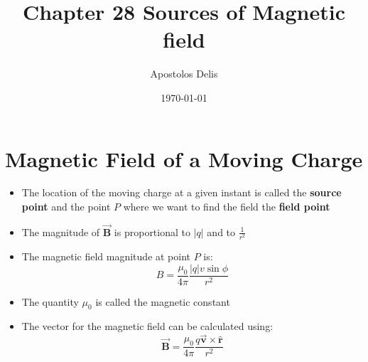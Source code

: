 \documentclass[11pt, a4paper]{article}
\begin{document}
\title{Chapter 28 Sources of Magnetic field}
\author{Apostolos Delis}

\date{\today}
\maketitle

\tableofcontents
\section[28.1, Magnetic Field of a Moving Charge]{Magnetic Field of a Moving Charge}
\begin{itemize}
    \item The location of the moving charge at a given instant is called the
        \textbf{source point} and the point $P$ where we want to find the field the
        \textbf{field point}
    \item The magnitude of $\vec{\mathbf{B}}$ is proportional to $|q|$ and to
        $\frac{1}{r^2}$
    \item The magnetic field magnitude at point $P$ is:
        \begin{equation}
            B = \frac{\mu_0}{4\pi} \frac{|q|v\sin\phi}{r^2}
        \end{equation}
    \item The quantity $\mu_0$ is called the magnetic constant
    \item The vector for the magnetic field can be calculated using:
        \begin{equation}
            \vec{\mathbf{B}} = \frac{\mu_0}{4\pi}
            \frac{q\vec{\mathbf{v}} \times \mathbf{\hat{r}}}{r^2}
        \end{equation}
\end{itemize}
\end{document}
